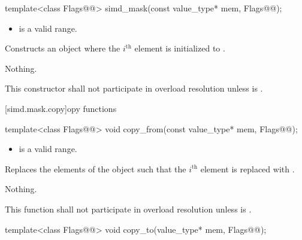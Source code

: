 \begin{itemdecl}
template<class Flags@@> simd_mask(const value_type* mem, Flags@\wgAdd{ = \{\}}@);
\end{itemdecl}

\begin{itemdescr}
  \pnum\requires
  \begin{itemize}
    \item \tcode{[mem, mem + size())} is a valid range.
  \end{itemize}

  \pnum\effects
  Constructs an object where the $i^\text{th}$ element is initialized to  \foralli.

  \pnum\throws Nothing.

  \pnum\remarks
  This constructor shall not participate in overload resolution unless  is .

\end{itemdescr}

[simd.mask.copy]{\texorpdfstring{opy}{simd_mask copy} functions}

\begin{itemdecl}
template<class Flags@@> void copy_from(const value_type* mem, Flags@\wgAdd{ = \{\}}@);
\end{itemdecl}

\begin{itemdescr}
  \pnum\requires
  \begin{itemize}
    \item \tcode{[mem, mem + size())} is a valid range.
  \end{itemize}

  \pnum\effects
  Replaces the elements of the  object such that the $i^\text{th}$ element is replaced with  \foralli.

  \pnum\throws Nothing.

  \pnum\remarks
  This function shall not participate in overload resolution unless  is .

\end{itemdescr}

\begin{itemdecl}
template<class Flags@@> void copy_to(value_type* mem, Flags@\wgAdd{ = \{\}}@);
\end{itemdecl}

